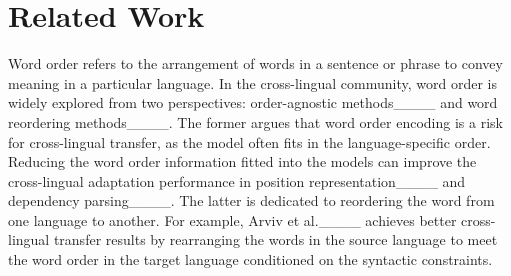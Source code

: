 \section{Related Work}
Word order refers to the arrangement of words in a sentence or phrase to convey meaning in a particular language. In the cross-lingual community, word order is widely explored from two perspectives: order-agnostic methods____ and word reordering methods____. The former argues that word order encoding is a risk for cross-lingual transfer, as the model often fits in the language-specific order. Reducing the word order information fitted into the models can improve the cross-lingual adaptation performance in position representation____ and dependency parsing____. The latter is dedicated to reordering the word from one language to another. For example, Arviv et al.____ achieves better cross-lingual transfer results by rearranging the words in the source language to meet the word order in the target language conditioned on the syntactic constraints.